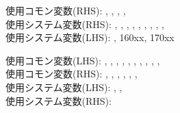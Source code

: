 \clearpage

\begin{hosoku}\small
使用コモン変数(RHS): , , , , \\
使用システム変数(RHS): , , , , , , , , , \\
使用システム変数(LHS): , \ttNum160xx, \ttNum170xx
\end{hosoku}


\clearpage

\begin{hosoku}\small
使用コモン変数(LHS): , , , , , , , , , , \\
使用コモン変数(RHS): , , , , , , \\
使用システム変数(LHS): , , \\
使用システム変数(RHS): 
\end{hosoku}


